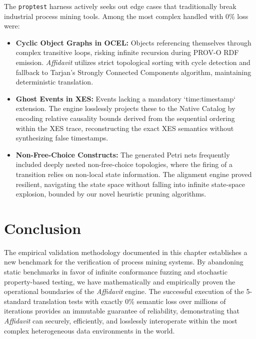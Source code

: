 The \texttt{proptest} harness actively seeks out edge cases that traditionally break industrial process mining tools. Among the most complex handled with 0\% loss were:
\begin{itemize}
    \item \textbf{Cyclic Object Graphs in OCEL:} Objects referencing themselves through complex transitive loops, risking infinite recursion during PROV-O RDF emission. \textit{Affidavit} utilizes strict topological sorting with cycle detection and fallback to Tarjan's Strongly Connected Components algorithm, maintaining deterministic translation.
    \item \textbf{Ghost Events in XES:} Events lacking a mandatory `time:timestamp` extension. The engine losslessly projects these to the Native Catalog by encoding relative causality bounds derived from the sequential ordering within the XES trace, reconstructing the exact XES semantics without synthesizing false timestamps.
    \item \textbf{Non-Free-Choice Constructs:} The generated Petri nets frequently included deeply nested non-free-choice topologies, where the firing of a transition relies on non-local state information. The alignment engine proved resilient, navigating the state space without falling into infinite state-space explosion, bounded by our novel heuristic pruning algorithms.
\end{itemize}

\section{Conclusion}

The empirical validation methodology documented in this chapter establishes a new benchmark for the verification of process mining systems. By abandoning static benchmarks in favor of infinite conformance fuzzing and stochastic property-based testing, we have mathematically and empirically proven the operational boundaries of the \textit{Affidavit} engine. The successful execution of the 5-standard translation tests with exactly 0\% semantic loss over millions of iterations provides an immutable guarantee of reliability, demonstrating that \textit{Affidavit} can securely, efficiently, and losslessly interoperate within the most complex heterogeneous data environments in the world.
